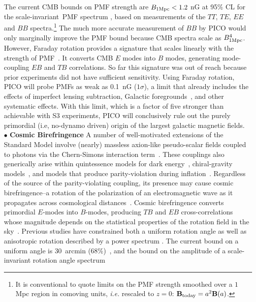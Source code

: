 \documentclass[PICOReport.tex]{subfiles}
\begin{document}
The current CMB bounds on PMF strength are $B_{\rm 1Mpc}<1.2$ nG at 95\% CL for the scale-invariant~PMF spectrum \cite{Zucca:2016iur}, based on measurements of the $TT$, $TE$, $EE$ and $BB$ spectra.\footnote{It is conventional to quote limits on the PMF strength smoothed over a $1$ Mpc region in comoving units, {\it i.e.} rescaled to $z=0$: $\mathbf{B}_{\rm today} = a^2\mathbf{B}(a)$.} 
The much more accurate measurement of $BB$ by PICO would only marginally improve the PMF bound because CMB spectra scale as $B^4_{1\rm{Mpc}}$. However, Faraday rotation provides a signature that scales linearly with the strength of PMF~\cite{Kosowsky:1996yc}. It converts CMB $E$ modes into $B$ modes, generating mode-coupling $EB$ and $TB$ correlations. So far this signature was out of reach because prior experiments did not have sufficient sensitivity. Using Faraday rotation, PICO will probe PMFs as weak as 0.1~nG ($1\sigma$), a limit that already includes the effects of imperfect lensing subtraction, Galactic foregrounds~\cite{Oppermann:2011td,De:2013dra,Pogosian:2013dya}, and other systematic effects. With this limit, which is a factor of five stronger than achievable with S3 experiments, PICO will conclusively rule out the purely primordial (i.e, no-dynamo driven) origin of the largest galactic magnetic fields. \\
%
$\bullet$ {\bf Cosmic Birefringence} \hspace{0.1in}
A number of well-motivated extensions of the Standard Model involve (nearly) massless axion-like pseudo-scalar fields coupled to photons via the Chern-Simons interaction term~\citep{Freese:1990rb,Frieman:1995pm,Carroll:1998zi,Kaloper:2005aj}. These couplings also generically arise within quintessence models for dark energy~\citep{Carroll:1998zi}, chiral-gravity models~\citep{2008PhRvL.101n1101C}, and models that produce parity-violation during inflation~\cite{Gluscevic:2010vv}. Regardless of the source of the parity-violating coupling, its presence may cause cosmic birefringence--a rotation of the polarization of an electromagnetic wave as it propagates across cosmological distances~\cite{Harari:1992ea,Carroll:1989vb,Carroll:1998zi}. Cosmic birefringence converts primordial $E$-modes into $B$-modes, producing $TB$ and $EB$ cross-correlations whose magnitude depends on the statistical properties of the rotation field in the sky~\cite{Kamionkowski:2008fp,Gluscevic:2009mm,Gluscevic:2012me}. Previous studies have constrained both a uniform rotation angle as well as anisotropic rotation described by a power spectrum \cite{Gluscevic:2012me}. The current bound on a uniform angle is 30~arcmin (68\%)~\cite{Aghanim:2016fhp}, and the bound on the amplitude of a scale-invariant rotation angle spectrum
\end{document}

